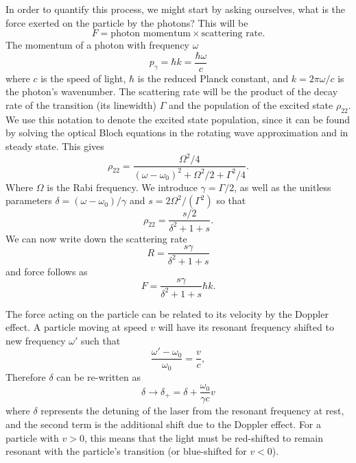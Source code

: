 In order to quantify this process, we might start by asking ourselves, what is
the force exerted on the particle by the photons? This will be
%
\begin{equation}
  F = \text{photon momentum} \times \text{scattering rate}.
\end{equation}
%
The momentum of a photon with frequency $\omega$
%
\begin{equation}
  p_\gamma = \hbar k = \frac{\hbar\omega}{c}
\end{equation}
%
where $c$ is the speed of light, $\hbar$ is the reduced Planck constant, and $k
= 2\pi\omega/c$ is the photon's wavenumber.
%
The scattering rate will be the product of the decay rate of the transition
(its linewidth) $\Gamma$ and the population of the excited state $\rho_{22}$.
We use this notation to denote the excited state population, since it can be
found by solving the optical Bloch equations in the rotating wave approximation
and in steady state. This gives~\cite{Metcalf1999}
%
\begin{equation}
\rho_{22} = \frac{\Omega^2/4}{(\omega-\omega_0)^2 + \Omega^2/2 + \Gamma^2/4}.
\end{equation}
%
Where $\Omega$ is the Rabi frequency. We introduce $\gamma=\Gamma/2$, as well
as the unitless parameters $\delta = (\omega - \omega_0)/\gamma$ and
$s=2\Omega^2/(\Gamma^2)$ so that
%
\begin{equation}
  \rho_{22} = \frac{s/2}{\delta^2 + 1 + s}.
\end{equation}
%
We can now write down the scattering rate
%
\begin{equation}
  R = \frac{s\gamma}{\delta^2 + 1 + s}
  \label{theory:eqn:scatteringrate}
\end{equation}
%
and force follows as
%
\begin{equation}
  F = \frac{s\gamma}{\delta^2 + 1 + s}\hbar k.
\end{equation}

The force acting on the particle can be related to its velocity by the Doppler
effect. A particle moving at speed $v$ will have its resonant frequency shifted
to new frequency $\omega'$ such that
%
\begin{equation}
  \frac{\omega'-\omega_0}{\omega_0} = \frac{v}{c},
\end{equation}
%
Therefore $\delta$ can be re-written as
%
\begin{equation}
  \delta \rightarrow \delta_+ = \delta + \frac{\omega_0}{\gamma c}v
\end{equation}
%
where $\delta$ represents the detuning of the laser from the resonant frequency
at rest, and the second term is the additional shift due to the Doppler effect.
For a particle with $v>0$, this means that the light must be red-shifted to
remain resonant with the particle's transition (or blue-shifted for $v<0$).

